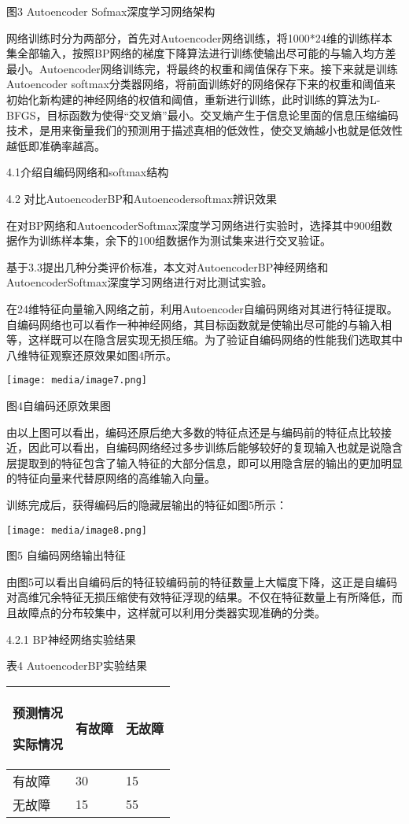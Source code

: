 图3 Autoencoder Sofmax深度学习网络架构

网络训练时分为两部分，首先对Autoencoder网络训练，将1000*24维的训练样本集全部输入，按照BP网络的梯度下降算法进行训练使输出尽可能的与输入均方差最小。Autoencoder网络训练完，将最终的权重和阈值保存下来。接下来就是训练Autoencoder
softmax分类器网络，将前面训练好的网络保存下来的权重和阈值来初始化新构建的神经网络的权值和阈值，重新进行训练，此时训练的算法为L-BFGS，目标函数为使得``交叉熵''最小。交叉熵产生于信息论里面的信息压缩编码技术，是用来衡量我们的预测用于描述真相的低效性，使交叉熵越小也就是低效性越低即准确率越高。

4.1介绍自编码网络和softmax结构

4.2 对比AutoencoderBP和Autoencodersoftmax辨识效果

在对BP网络和AutoencoderSoftmax深度学习网络进行实验时，选择其中900组数据作为训练样本集，余下的100组数据作为测试集来进行交叉验证。

基于3.3提出几种分类评价标准，本文对AutoencoderBP神经网络和AutoencoderSoftmax深度学习网络进行对比测试实验。

在24维特征向量输入网络之前，利用Autoencoder自编码网络对其进行特征提取。自编码网络也可以看作一种神经网络，其目标函数就是使输出尽可能的与输入相等，这样既可以在隐含层实现无损压缩。为了验证自编码网络的性能我们选取其中八维特征观察还原效果如图4所示。

\texttt{[image: media/image7.png]}

图4自编码还原效果图

由以上图可以看出，编码还原后绝大多数的特征点还是与编码前的特征点比较接近，因此可以看出，自编码网络经过多步训练后能够较好的复现输入也就是说隐含层提取到的特征包含了输入特征的大部分信息，即可以用隐含层的输出的更加明显的特征向量来代替原网络的高维输入向量。

训练完成后，获得编码后的隐藏层输出的特征如图5所示：

\texttt{[image: media/image8.png]}

图5 自编码网络输出特征

由图5可以看出自编码后的特征较编码前的特征数量上大幅度下降，这正是自编码对高维冗余特征无损压缩使有效特征浮现的结果。不仅在特征数量上有所降低，而且故障点的分布较集中，这样就可以利用分类器实现准确的分类。

4.2.1 BP神经网络实验结果

表4 AutoencoderBP实验结果

\begin{longtable}[c]{@{}lll@{}}
\toprule
预测情况

实际情况 & 有故障 & 无故障\tabularnewline
\midrule
\endhead
有故障 & 30 & 15\tabularnewline
无故障 & 15 & 55\tabularnewline
\bottomrule
\end{longtable}

